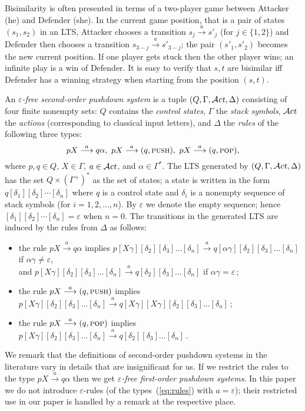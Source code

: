 \documentclass[11pt]{article}
\newcommand{\push}{\textsc{push}\xspace}
\newcommand{\pop}{\textsc{pop}\xspace}
\newcommand{\act}{\mbox{${\cal A}${\sl ct}}}
\newcommand{\goes}[1]{\ensuremath{\stackrel{#1}{\longrightarrow}}}
\begin{document}
Bisimilarity is often presented
in terms of a two-player game
between Attacker (he) and Defender (she).
In the current game position, that is a pair of states $(s_1,s_2)$ 
in an LTS,
Attacker chooses a transition $s_j\goes{a}s'_j$ (for $j\in\{1,2\}$)
and Defender then chooses a transition
$s_{3-j}\goes{a}s'_{3-j}$; 
the pair $(s'_1,s'_2)$ becomes the new current position.
If one player gets stuck then the other player wins;
an infinite play is a win of Defender. It is easy to verify
that $s, t$ are
bisimilar iff Defender has a winning strategy when starting from
the position $(s,t)$.

An \emph{$\varepsilon$-free second-order pushdown system}
is a tuple $(Q,\Gamma,\act,\Delta)$ consisting of
four finite nonempty sets:
$Q$ contains the
\emph{control states}, 
$\Gamma$ the \emph{stack symbols},
$\act$ the
\emph{actions} (corresponding to classical input letters),
and $\Delta$ the \emph{rules} of the following three types:
\begin{equation}\label{eq:rules}
pX \goes{a} q \alpha, 
\  pX \goes{a} (q,\push),
\ pX \goes{a} (q, \pop),
\end{equation}
where  $p,q \in Q$, 
$X \in \Gamma$,
$a \in \act$, and $\alpha \in \Gamma^*$.
The LTS generated by $(Q,\Gamma,\act,\Delta)$
has the set $Q\times(\Gamma^+)^*$ as the set of states; 
a state is written in the form $q[\delta_1][\delta_2]\cdots [\delta_n]$
where $q$ is a control state and 
$\delta_i$ is a nonempty sequence of stack symbols (for $i=1,2,\dots,n$).
By $\varepsilon$ we denote the empty sequence; hence
$[\delta_1][\delta_2]\cdots [\delta_n]=\varepsilon$ when $n=0$.
The transitions in the generated LTS are induced by the rules from $\Delta$ as
follows:
\begin{itemize}
\item
the rule $pX\goes{a}q\alpha$ implies 
$p[X\gamma][\delta_2][\delta_3]\dots [\delta_n]\goes{a}
q[\alpha\gamma][\delta_2][\delta_3]\dots [\delta_n]$ if
$\alpha\gamma\neq\varepsilon$,
\\
and  $p[X\gamma][\delta_2][\delta_3]\dots [\delta_n]\goes{a}
q[\delta_2][\delta_3]\dots [\delta_n]$ if $\alpha\gamma=\varepsilon$\,;
\item the rule
$pX\goes{a}(q,\push)$ implies 
$p[X\gamma][\delta_2][\delta_3]\dots [\delta_n]\goes{a}
q[X\gamma][X\gamma][\delta_2][\delta_3]\dots [\delta_n]$\,;
\item the rule
$pX\goes{a} (q,\pop)$ implies 
$p[X\gamma][\delta_2][\delta_3]\dots [\delta_n]\goes{a}
q[\delta_2][\delta_3]\dots [\delta_n]$\,.
\end{itemize}
We remark that the definitions of second-order pushdown systems in the
literature vary in details that are insignificant for us.
If we restrict the rules to the type $pX\goes{a}q\alpha$ then we get 
\emph{$\varepsilon$-free first-order pushdown systems}.
In this paper we do not introduce $\varepsilon$-rules 
(of the types~(\ref{eq:rules}) with $a=\varepsilon$);
their restricted use in our paper is handled by a remark at the
respective place. 
\end{document}
